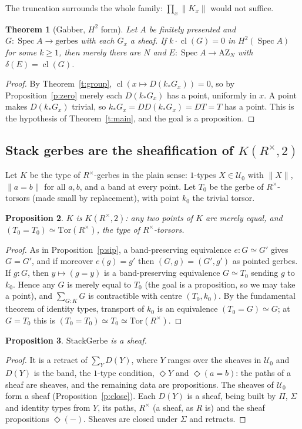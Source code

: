 \documentclass[11pt]{amsart}
\newtheorem{theorem}{Theorem}[section]
\newtheorem{proposition}[theorem]{Proposition}
\theoremstyle{definition}
\theoremstyle{remark}
\newcommand{\Spec}{\operatorname{Spec}}
\newcommand{\cl}{\operatorname{cl}}
\newcommand{\close}{\Diamond}
\newcommand{\tr}[1]{\|#1\|}
\newcommand{\Rx}{R^\times}
\newcommand{\U}{\mathcal U}
\begin{document}
The truncation surrounds the whole family: $\prod_x\tr{K_x}$ would not
suffice.

\begin{theorem}[Gabber, $H^2$ form]\label{t:torsion}
Let $A$ be finitely presented and $G:\Spec A\to\text{gerbes}$ with each
$G_x$ a sheaf. If $k\cdot\cl(G)=0$ in $H^2(\Spec A)$ for some $k\geq1$,
then merely there are $N$ and $E:\Spec A\to\mathrm{AZ}_N$ with
$\delta(E)=\cl(G)$.
\end{theorem}
\begin{proof}
By Theorem~\ref{t:group}, $\cl(x\mapsto D(k_*G_x))=0$, so by
Proposition~\ref{p:zero} merely each $D(k_*G_x)$ has a point, uniformly in
$x$. A point makes $D(k_*G_x)$ trivial, so $k_*G_x=DD(k_*G_x)=DT=T$ has a
point. This is the hypothesis of Theorem~\ref{t:main}, and the goal is a
proposition.
\end{proof}

\subsection{Stack gerbes are the sheafification of \texorpdfstring{$K(\Rx,2)$}{K(Rx,2)}}\label{s:k2}

Let $K$ be the type of $\Rx$-gerbes in the plain sense: $1$-types $X\in\U_0$
with $\tr X$, $\tr{a=b}$ for all $a,b$, and a band at every point. Let $T_0$
be the gerbe of $\Rx$-torsors (made small by replacement), with point
$k_0$ the trivial torsor.

\begin{proposition}\label{p:k2}
$K$ is $K(\Rx,2)$: any two points of $K$ are merely equal, and
$(T_0=T_0)\simeq\mathrm{Tor}(\Rx)$, the type of $\Rx$-torsors.
\end{proposition}
\begin{proof}
As in Proposition~\ref{p:sip}, a band-preserving equivalence $e:G\simeq G'$
gives $G=G'$, and if moreover $e(g)=g'$ then $(G,g)=(G',g')$ as pointed
gerbes. If $g:G$, then $y\mapsto(g=y)$ is a band-preserving equivalence
$G\simeq T_0$ sending $g$ to $k_0$. Hence any $G$ is merely equal to $T_0$
(the goal is a proposition, so we may take a point), and
$\sum_{G:K}G$ is contractible with centre $(T_0,k_0)$. By the fundamental
theorem of identity types, transport of $k_0$ is an equivalence
$(T_0=G)\simeq G$; at $G=T_0$ this is $(T_0=T_0)\simeq T_0\simeq\mathrm{Tor}(\Rx)$.
\end{proof}

\begin{proposition}\label{p:stack-sheaf}
$\mathrm{StackGerbe}$ is a sheaf.
\end{proposition}
\begin{proof}
It is a retract of $\sum_{Y}D(Y)$, where $Y$ ranges over the sheaves in
$\U_0$ and $D(Y)$ is the band, the $1$-type condition, $\close Y$ and
$\close(a=b)$: the paths of a sheaf are sheaves, and the remaining data are
propositions. The sheaves of $\U_0$ form a sheaf (Proposition~\ref{p:close}).
Each $D(Y)$ is a sheaf, being built by $\Pi$, $\Sigma$ and identity types from
$Y$, its paths, $\Rx$ (a sheaf, as $R$ is) and the sheaf propositions
$\close(-)$. Sheaves are closed under $\Sigma$ and retracts.
\end{proof}
\end{document}
